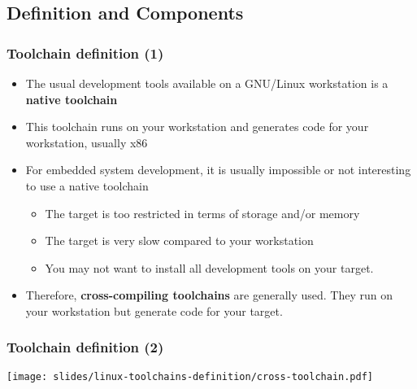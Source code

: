 \subsection{Definition and Components}

\begin{frame}
  \frametitle{Toolchain definition (1)}
  \begin{itemize}
  \item The usual development tools available on a GNU/Linux
        workstation is a {\bf native toolchain}
  \item This toolchain runs on your workstation and generates code for
        your workstation, usually x86
  \item For embedded system development, it is usually impossible or not
        interesting to use a native toolchain
    \begin{itemize}
    \item The target is too restricted in terms of storage and/or memory
    \item The target is very slow compared to your workstation
    \item You may not want to install all development tools on your target.
    \end{itemize}
  \item Therefore, {\bf cross-compiling toolchains} are generally used.
        They run on your workstation but generate code for your target.
  \end{itemize}
\end{frame}

\begin{frame}
  \frametitle{Toolchain definition (2)}
  \begin{center}
    \texttt{[image: slides/linux-toolchains-definition/cross-toolchain.pdf]}
  \end{center}
\end{frame}


